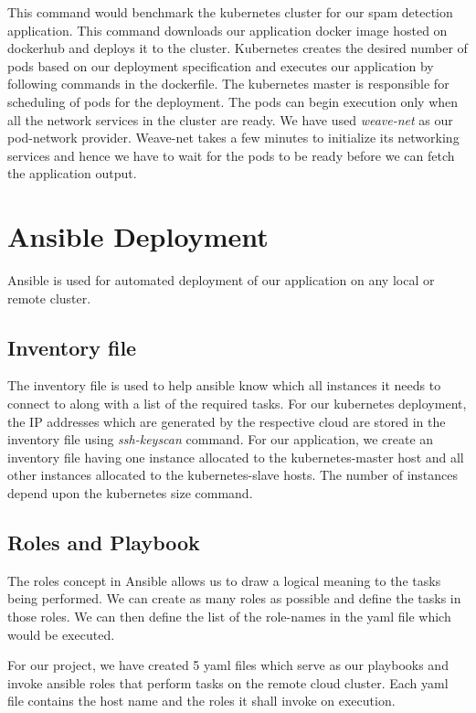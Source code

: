 \documentclass[9pt,twocolumn,twoside]{../../styles/osajnl}
\begin{document}
{This command would benchmark the kubernetes cluster for our spam
detection application. This command downloads our application docker
image hosted on dockerhub and deploys it to the cluster. Kubernetes
creates the desired number of pods based on our deployment
specification and executes our application by following commands in
the dockerfile. The kubernetes master is responsible for scheduling of
pods for the deployment. The pods can begin execution only when all
the network services in the cluster are ready. We have used
\emph{weave-net} as our pod-network provider. Weave-net takes a few
minutes to initialize its networking services and hence we have to
wait for the pods to be ready before we can fetch the application
output.

\section{Ansible Deployment}
Ansible is used for automated deployment of our application on any
local or remote cluster.

\subsection{Inventory file}
The inventory file is used to help ansible know which all instances it
needs to connect to along with a list of the required tasks. For our
kubernetes deployment, the IP addresses which are generated by the
respective cloud are stored in the inventory file using
\emph{ssh-keyscan} command. For our application, we create an
inventory file having one instance allocated to the kubernetes-master
host and all other instances allocated to the kubernetes-slave
hosts. The number of instances depend upon the kubernetes size
command.

\subsection{Roles and Playbook}
The roles concept in Ansible allows us to draw a logical meaning to the
tasks being performed. We can create as many roles as possible and
define the tasks in those roles. We can then define the list of the
role-names in the yaml file which would be executed.\newline

\noindent
For our project, we have created 5 yaml files which serve as our
playbooks and invoke ansible roles that perform tasks on the remote
cloud cluster. Each yaml file contains the host name and the roles it
shall invoke on execution.\newline

}
\end{document}
